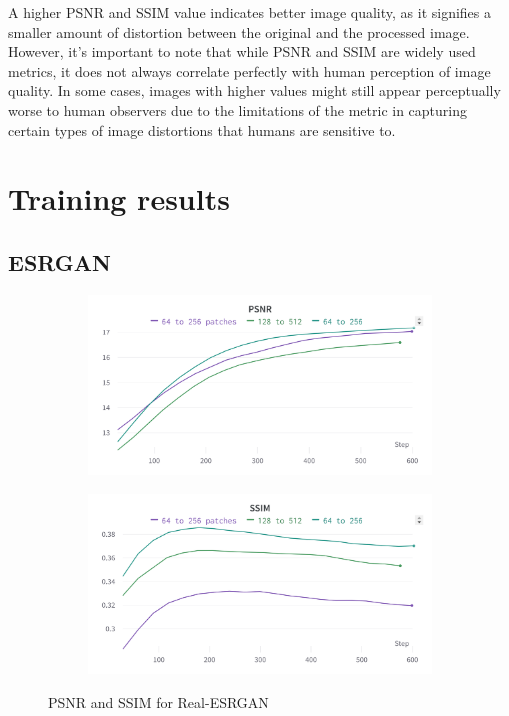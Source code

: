 A higher PSNR and SSIM value indicates better image quality, as it signifies a smaller amount of distortion between the original and the processed image. However, it's important to note that while PSNR and SSIM are widely used metrics, it does not always correlate perfectly with human perception of image quality. In some cases, images with higher values might still appear perceptually worse to human observers due to the limitations of the metric in capturing certain types of image distortions that humans are sensitive to.

\section{Training results}
\label{sec:training_res}

\subsection{ESRGAN}
\label{subsec:training_esrgan}

\begin{figure}[H]
  \centering
  \begin{subfigure}{.5\textwidth}
    \centering
    \includegraphics[width=1\linewidth]{figures/ESRGAN_psnr.png}
    \label{fig:esrgan_psnr}
  \end{subfigure}%
  \begin{subfigure}{.5\textwidth}
    \centering
    \includegraphics[width=1\linewidth]{figures/ESRGAN_ssim.png}
    \label{fig:esrgan_ssim}
  \end{subfigure}
  \caption{PSNR and SSIM for Real-ESRGAN}
  \label{fig:esrgan_metrics}
\end{figure}


